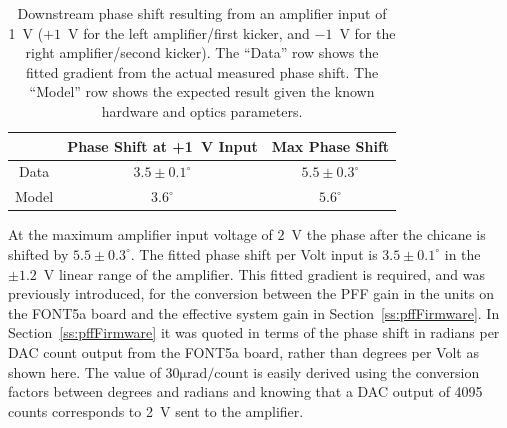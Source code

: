 \begin{table}
  \begin{center}
    \begin{tabular}{| c | c | c |}
	   \hline
        & Phase Shift at +1~V Input & Max Phase Shift \\ \hline
       Data & \(3.5\pm0.1^\circ\) & \(5.5\pm0.3^\circ\) \\
	   Model & \(3.6^\circ\) & \(5.6^\circ\) \\
 	   \hline
    \end{tabular}
    \caption{Downstream phase shift resulting from an amplifier input of 1~V (\(+1\)~V for the left amplifier/first kicker, and \(-1\)~V for the right amplifier/second kicker). The ``Data'' row shows the fitted gradient from the actual measured phase shift. The ``Model'' row shows the expected result given the known hardware and optics parameters.}
  	\label{t:PhaseVsDAC}
  \end{center}
\end{table}

At the maximum amplifier input voltage of \(2\)~V the phase after the chicane is shifted by \(5.5\pm0.3^\circ\). The fitted phase shift per Volt input is \(3.5\pm0.1^\circ\) in the \(\pm1.2\)~V linear range of the amplifier. This fitted gradient is required, and was previously introduced, for the conversion between the PFF gain in the units on the FONT5a board and the effective system gain in Section~\ref{ss:pffFirmware}. In Section~\ref{ss:pffFirmware} it was quoted in terms of the phase shift in radians per DAC count output from the FONT5a board, rather than degrees per Volt as shown here. The value of \(30\mathrm{\mu rad/count}\) is easily derived using the conversion factors between degrees and radians and knowing that a DAC output of 4095 counts corresponds to 2~V sent to the amplifier.

